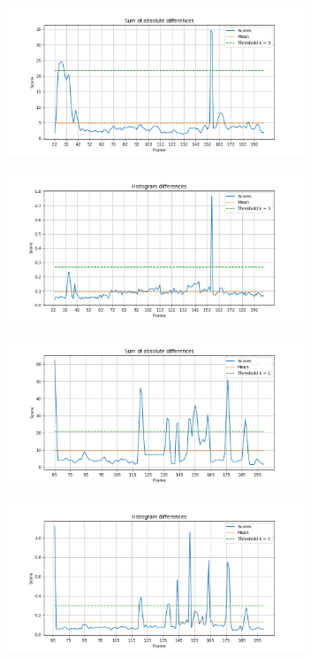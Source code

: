 \documentclass{article}
\begin{document}
\begin{minipage}{0.5\linewidth}
 \label{fig: clip_1_sad2}
\centering
\includegraphics[width=3.5in]{../output/clip_1_score_sad2.png}
\end{minipage}%
\begin{minipage}{0.5\linewidth}
 \label{fig: clip_1_hd}
\centering
\includegraphics[width=3.5in]{../output/clip_1_score_hd.png}
\end{minipage}

\begin{minipage}{0.5\linewidth}
 \label{fig: clip_2_sad2}
\centering
\includegraphics[width=3.5in]{../output/clip_2_score_sad2.png}
\end{minipage}%
\begin{minipage}{0.5\linewidth}
 \label{fig: clip_2_hd}
\centering
\includegraphics[width=3.5in]{../output/clip_2_score_hd.png}
\end{minipage}
\end{document}
